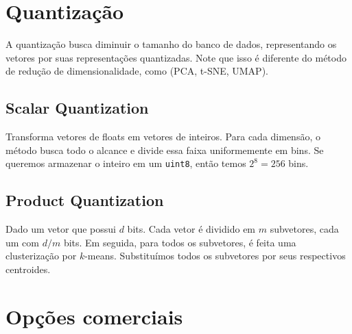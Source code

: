 \section{Quantização}

A quantização busca diminuir o tamanho do banco de dados, representando os vetores por suas representações quantizadas. Note que isso é diferente do método de redução de dimensionalidade, como (PCA, t-SNE, UMAP).

\subsection{Scalar Quantization}

Transforma vetores de floats em vetores de inteiros. Para cada dimensão, o método busca todo o alcance e divide essa faixa uniformemente em bins. Se queremos armazenar o inteiro em um \texttt{uint8}, então temos $2^8 = 256$ bins.

\subsection{Product Quantization}

Dado um vetor que possui $d$ bits. Cada vetor é dividido em $m$ subvetores, cada um com $d/m$ bits. Em seguida, para todos os subvetores, é feita uma clusterização por $k$-means. Substituímos todos os subvetores por seus respectivos centroides.


\section{Opções comerciais}





\printbibliography